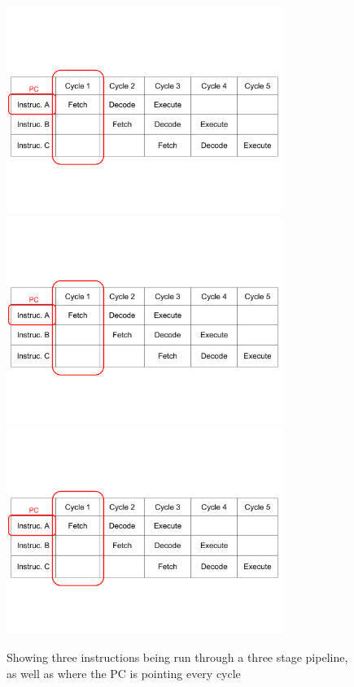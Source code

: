 \begin{figure}
  \centering
  \includegraphics[page=1, clip=true, trim=1mm 40mm 1mm 57mm, width=0.8\textwidth]{./fig/pipeline.pdf}
  \includegraphics[page=2, clip=true, trim=1mm 40mm 1mm 57mm, width=0.8\textwidth]{./fig/pipeline.pdf}
  \includegraphics[page=3, clip=true, trim=1mm 40mm 1mm 57mm, width=0.8\textwidth]{./fig/pipeline.pdf}
\caption{Showing three instructions being run through a three stage pipeline, as well as where the PC is pointing every cycle}
\label{fig:pipeline}
\end{figure}

